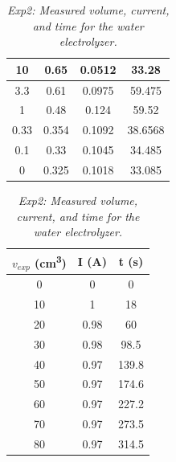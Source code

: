 \begin{table}[H]
\begin{minipage}{0.45\textwidth}
\begin{tabular}{|c|c|c|c|}
                    \hline
                    10 & 0.65 & 0.0512 & 33.28 \\
                    \hline
                    3.3 & 0.61 & 0.0975 & 59.475 \\
                    \hline
                    1 & 0.48 & 0.124 & 59.52 \\
                    \hline
                    0.33 & 0.354 & 0.1092 & 38.6568 \\
                    \hline
                    0.1 & 0.33 & 0.1045 & 34.485 \\
                    \hline
                    0 & 0.325 & 0.1018 & 33.085 \\
                    \hline
                \end{tabular}
                \label{tab:exp3_results}
            \end{minipage}
    \vspace{1cm}
    \begin{minipage}{0.45\textwidth}
        \centering
        \caption{\textit{Exp2: Measured volume, current, and time for the water electrolyzer.}}
        \renewcommand{\arraystretch}{1.4} %
        \setlength{\tabcolsep}{8pt} %
        \begin{tabular}{|c|c|c|}
            \hline
            \textbf{$v_{exp}$ (\si{\centi\meter\cubed})} & \textbf{I (\si{\ampere})} & \textbf{t (\si{\second})} \\
            \hline
            0 & 0 & 0 \\
            \hline
            10 & 1 & 18 \\
            \hline
            20 & 0.98 & 60 \\
            \hline
            30 & 0.98 & 98.5 \\
            \hline
            40 & 0.97 & 139.8 \\
            \hline
            50 & 0.97 & 174.6 \\
            \hline
            60 & 0.97 & 227.2 \\
            \hline
            70 & 0.97 & 273.5 \\
            \hline
            80 & 0.97 & 314.5 \\
            \hline
        \end{tabular}
        \label{tab:exp2_results}
    \end{minipage}
    \hfill
    \begin{minipage}{0.45\textwidth}

\end{minipage}
\end{table}
